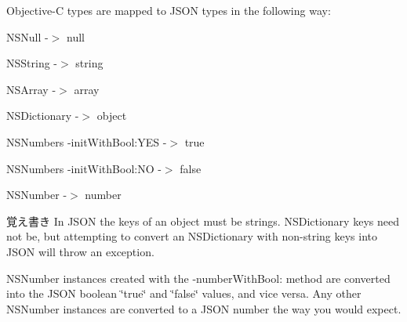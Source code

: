 Objective-\/\+C types are mapped to J\+S\+O\+N types in the following way\+:

\begin{DoxyItemize}
\item N\+S\+Null -\/$>$ null \item N\+S\+String -\/$>$ string \item N\+S\+Array -\/$>$ array \item N\+S\+Dictionary -\/$>$ object \item N\+S\+Number\textquotesingle{}s -\/init\+With\+Bool\+:Y\+E\+S -\/$>$ true \item N\+S\+Number\textquotesingle{}s -\/init\+With\+Bool\+:N\+O -\/$>$ false \item N\+S\+Number -\/$>$ number\end{DoxyItemize}
\begin{DoxyNote}{覚え書き}
In J\+S\+O\+N the keys of an object must be strings. N\+S\+Dictionary keys need not be, but attempting to convert an N\+S\+Dictionary with non-\/string keys into J\+S\+O\+N will throw an exception.
\end{DoxyNote}
N\+S\+Number instances created with the -\/number\+With\+Bool\+: method are converted into the J\+S\+O\+N boolean \char`\"{}true\char`\"{} and \char`\"{}false\char`\"{} values, and vice versa. Any other N\+S\+Number instances are converted to a J\+S\+O\+N number the way you would expect. 
